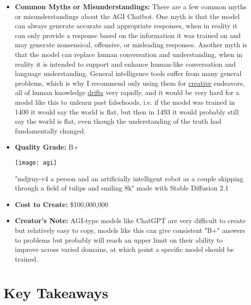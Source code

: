 \begin{itemize}
    \item \textbf{Common Myths or Misunderstandings:} There are a few common myths or misunderstandings about the AGI Chatbot. One myth is that the model can always generate accurate and appropriate responses, when in reality it can only provide a response based on the information it was trained on and may generate nonsensical, offensive, or misleading responses. Another myth is that the model can replace human conversation and understanding, when in reality it is intended to support and enhance human-like conversation and language understanding. General intelligence tools suffer from many general problems, which is why I recommend only using them for \hyperref[sec:creative]{creative} endeavors, all of human knowledge \hyperref[sec:drift]{drifts} very rapidly, and it would be very hard for a model like this to unlearn past falsehoods, i.e. if the model was trained in 1400 it would say the world is flat, but then in 1493 it would probably still say the world is flat, even though the understanding of the truth had fundamentally changed. 
    \item \textbf{Quality Grade:} B+

\begin{pdf}
\begin{marginfigure}[-5.5cm]
        \texttt{[image: agi]}
        \caption{"mdjrny-v4 a person and an artificially intelligent robot as a couple skipping through a field of tulips and smiling 8k" made with Stable Diffusion 2.1}
\end{marginfigure}
\end{pdf}

    \item \textbf{Cost to Create:} \$100,000,000
    \item \textbf{Creator's Note:} AGI-type models like ChatGPT are very difficult to create but relatively easy to copy, models like this can give consistent "B+" answers to problems but probably will reach an upper limit on their ability to improve across varied domains, at which point a specific model should be trained.
\end{itemize}

\section{Key Takeaways}


